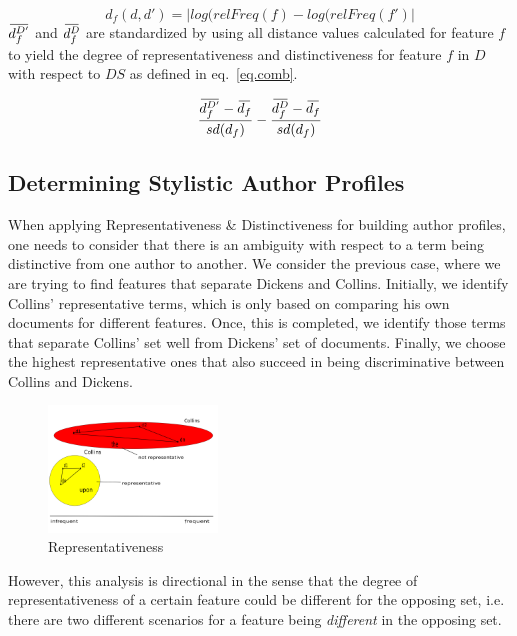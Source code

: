 \documentclass[a4paper,10pt,twoside,fleqn]{article}
\newcommand{\overbar}[1]{\mkern 2.0mu\overline{\mkern-2.0mu#1\mkern-2.0mu}\mkern 2.0mu}
\begin{document}
\begin{equation} \label{eq.dist}
 d_f(d,d') = |log(relFreq(f) - log(relFreq(f')|
\end{equation}
$\overbar{d_f^{D'}}$  and $\overbar{d_f^{D}}$ are standardized by using all 
distance values calculated for feature $f$ to yield the 
degree of representativeness and distinctiveness for
feature $f$ in $D$ with respect to $DS$ as defined in eq.~\ref{eq.comb}.
 
 \begin{equation}\label{eq.comb}
\frac{\overbar{d^{D'}_f} - \overbar{d_f} }{sd(d_f)} - \frac{\overbar{d^{D}_f} - \overbar{d_f}}{sd(d_f)}
\end{equation}


\subsection{Determining Stylistic Author Profiles}

When applying Representativeness \& Distinctiveness for building author profiles, 
one needs to consider that there is an ambiguity with respect to a term being 
distinctive from one author to another. 
We consider the previous case, where we are trying to find features that 
separate Dickens and Collins. 
Initially, we identify Collins' representative terms, which is only based on
comparing his own documents for different features. Once, this is completed, 
we identify those terms that separate Collins' set well from Dickens' set
of documents. 
Finally, we choose the highest representative ones that also succeed in
being discriminative between Collins and Dickens. 

\begin{figure}
  \caption{Representativeness}
 \begin{center}
  \includegraphics[width=0.4\textwidth]{figures/repres1-fin.png}
  \end{center}
 \end{figure}
 
However, this analysis is directional in the sense that the degree
of representativeness of a certain feature could be different 
for the opposing set, i.e. there are two different scenarios
for a feature being \emph{different} in the opposing set. 
\end{document}
